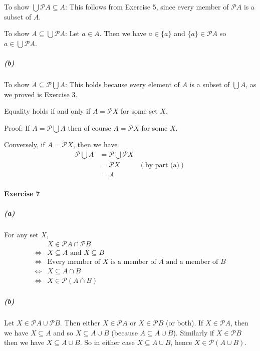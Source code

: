 \documentclass{report}
\begin{document}
    To show $\bigcup \mathcal{P} A \subseteq A$: This follows from Exercise 5, since every member of $\mathcal{P} A$
    is a subset of $A$.

    To show $A \subseteq \bigcup \mathcal{P} A$: Let $a \in A$. Then we have $a \in \{a\}$ and 
    $\{a\} \in \mathcal{P} A$ so $a \in \bigcup \mathcal{P} A$.

    \subparagraph{(b)}
    To show $A \subseteq \mathcal{P} \bigcup A$: This holds because every element of $A$ is a subset of
    $\bigcup A$, as we proved is Exercise 3.

    Equality holds if and only if $A = \mathcal{P} X$ for some set $X$.

    Proof: If $A = \mathcal{P} \bigcup A$ then of course $A = \mathcal{P} X$ for some $X$.

    Conversely, if $A = \mathcal{P} X$, then we have
    \begin{align*}
        \mathcal{P} \bigcup A & = \mathcal{P} \bigcup \mathcal{P} X \\
        & = \mathcal{P} X & (\text{by part (a)}) \\
        & = A
    \end{align*}

    \paragraph{Exercise 7}

    \subparagraph{(a)}
    For any set $X$,
    \begin{align*}
        & X \in \mathcal{P} A \cap \mathcal{P} B \\
        \Leftrightarrow & X \subseteq A \text{ and } X \subseteq B \\
        \Leftrightarrow & \text{Every member of $X$ is a member of $A$ and a member of $B$}  \\
        \Leftrightarrow & X \subseteq A \cap B \\
        \Leftrightarrow & X \in \mathcal{P} (A \cap B)
    \end{align*}

    \subparagraph{(b)}
    Let $X \in \mathcal{P} A \cup \mathcal{P} B$. Then either $X \in \mathcal{P} A$ or $X \in \mathcal{P} B$
    (or both). If $X \in \mathcal{P} A$, then we have $X \subseteq A$ and so $X \subseteq A \cup B$ (because
    $A \subseteq A \cup B$). Similarly if $X \in \mathcal{P} B$ then we have $X \subseteq A \cup B$. So in
    either case $X \subseteq A \cup B$, hence $X \in \mathcal{P} (A \cup B)$.
\end{document}
